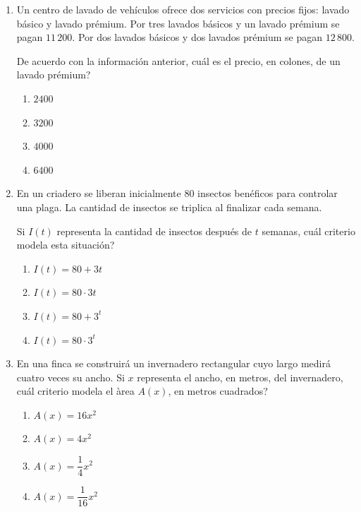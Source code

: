 \documentclass[12pt]{article}
\newcommand{\opcion}[2]{\item $#2$}
\begin{document}
\begin{enumerate}[label=\textbf{\arabic*.}, start=29, itemsep=1cm]
De ellas, \textquestiondown cu\'al o cu\'ales son verdaderas?

\begin{enumerate}[label=\Alph*)]
  \item Ambas.
  \item Solo I.
  \item Solo II.
  \item Ninguna.
\end{enumerate}

\Needspace{0.40\textheight}
\item
Un centro de lavado de veh\'iculos ofrece dos servicios con precios fijos: lavado b\'asico y lavado pr\'emium. Por tres lavados b\'asicos y un lavado pr\'emium se pagan \textcolonmonetary $11\,200$. Por dos lavados b\'asicos y dos lavados pr\'emium se pagan \textcolonmonetary $12\,800$.

De acuerdo con la informaci\'on anterior, \textquestiondown cu\'al es el precio, en colones, de un lavado pr\'emium?

\begin{enumerate}[label=\Alph*)]
  \opcion{A}{2400}
  \opcion{B}{3200}
  \opcion{C}{4000}
  \opcion{D}{6400}
\end{enumerate}

\Needspace{0.40\textheight}
\item
En un criadero se liberan inicialmente $80$ insectos ben\'eficos para controlar una plaga. La cantidad de insectos se triplica al finalizar cada semana.

Si $I(t)$ representa la cantidad de insectos despu\'es de $t$ semanas, \textquestiondown cu\'al criterio modela esta situaci\'on?

\begin{enumerate}[label=\Alph*)]
  \opcion{A}{I(t)=80+3t}
  \opcion{B}{I(t)=80\cdot 3t}
  \opcion{C}{I(t)=80+3^t}
  \opcion{D}{I(t)=80\cdot 3^t}
\end{enumerate}

\Needspace{0.38\textheight}
\item
En una finca se construir\'a un invernadero rectangular cuyo largo medir\'a cuatro veces su ancho. Si $x$ representa el ancho, en metros, del invernadero, \textquestiondown cu\'al criterio modela el \`area $A(x)$, en metros cuadrados?

\begin{enumerate}[label=\Alph*)]
  \opcion{A}{A(x)=16x^2}
  \opcion{B}{A(x)=4x^2}
  \opcion{C}{A(x)=\dfrac{1}{4}x^2}
  \opcion{D}{A(x)=\dfrac{1}{16}x^2}
\end{enumerate}


\end{enumerate}
\end{document}
